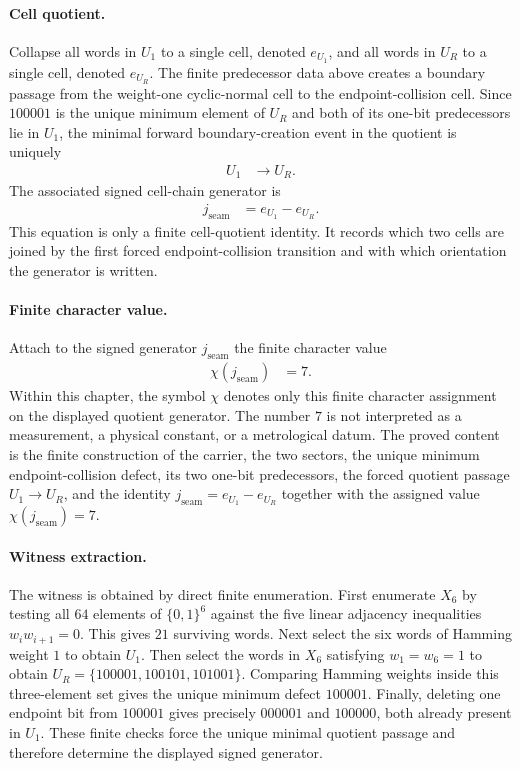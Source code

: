 \paragraph{Cell quotient.}
Collapse all words in $U_1$ to a single cell, denoted $e_{U_1}$, and all words in $U_R$ to a single cell, denoted $e_{U_R}$.  The finite predecessor data above creates a boundary passage from the weight-one cyclic-normal cell to the endpoint-collision cell.  Since $100001$ is the unique minimum element of $U_R$ and both of its one-bit predecessors lie in $U_1$, the minimal forward boundary-creation event in the quotient is uniquely
$$
\begin{aligned}
U_1&\longrightarrow U_R.
\end{aligned}
$$
The associated signed cell-chain generator is
$$
\begin{aligned}
j_{\mathrm{seam}}&=e_{U_1}-e_{U_R}.
\end{aligned}
$$
This equation is only a finite cell-quotient identity.  It records which two cells are joined by the first forced endpoint-collision transition and with which orientation the generator is written.

\paragraph{Finite character value.}
Attach to the signed generator $j_{\mathrm{seam}}$ the finite character value
$$
\begin{aligned}
\chi(j_{\mathrm{seam}})&=7.
\end{aligned}
$$
Within this chapter, the symbol $\chi$ denotes only this finite character assignment on the displayed quotient generator.  The number $7$ is not interpreted as a measurement, a physical constant, or a metrological datum.  The proved content is the finite construction of the carrier, the two sectors, the unique minimum endpoint-collision defect, its two one-bit predecessors, the forced quotient passage $U_1\to U_R$, and the identity $j_{\mathrm{seam}}=e_{U_1}-e_{U_R}$ together with the assigned value $\chi(j_{\mathrm{seam}})=7$.

\paragraph{Witness extraction.}
The witness is obtained by direct finite enumeration.  First enumerate $X_6$ by testing all $64$ elements of $\{0,1\}^6$ against the five linear adjacency inequalities $w_iw_{i+1}=0$.  This gives $21$ surviving words.  Next select the six words of Hamming weight $1$ to obtain $U_1$.  Then select the words in $X_6$ satisfying $w_1=w_6=1$ to obtain $U_R=\{100001,100101,101001\}$.  Comparing Hamming weights inside this three-element set gives the unique minimum defect $100001$.  Finally, deleting one endpoint bit from $100001$ gives precisely $000001$ and $100000$, both already present in $U_1$.  These finite checks force the unique minimal quotient passage and therefore determine the displayed signed generator.


